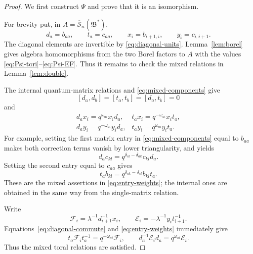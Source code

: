 \documentclass[11pt]{amsart}
\theoremstyle{remark}
\newcommand{\rSk}{\overline{\mathscr S}_n}
\newcommand{\Bstar}{\mathfrak B^{*}}
\begin{document}
\begin{proof}
We first construct $\Psi$ and prove that it is an isomorphism.

For brevity put, in $A=\rSk(\Bstar)$,
\[
 d_a=b_{aa},\qquad t_a=c_{aa},\qquad
 x_i=b_{i+1,i},\qquad y_i=c_{i,i+1}.
\]
The diagonal elements are invertible by
\eqref{eq:diagonal-units}.  Lemma~\ref{lem:borel} gives algebra
homomorphisms from the two Borel factors to $A$ with the values
\eqref{eq:Psi-tori}--\eqref{eq:Psi-EF}.  Thus it remains to check the
mixed relations in Lemma~\ref{lem:double}.

The internal quantum-matrix relations and
\eqref{eq:mixed-components} give
\begin{equation}\label{eq:diagonal-commute}
 [d_a,d_b]=[t_a,t_b]=[d_a,t_b]=0
\end{equation}
and
\begin{equation}\label{eq:entry-weights}
 \begin{array}{ll}
 d_ax_i=q^{\omega_{ai}}x_id_a,
   & t_ax_i=q^{-\omega_{ai}}x_it_a,\\[2pt]
 d_ay_i=q^{-\omega_{ai}}y_id_a,
   & t_ay_i=q^{\omega_{ai}}y_it_a.
 \end{array}
\end{equation}
For example, setting the first matrix entry in
\eqref{eq:mixed-components} equal to $b_{aa}$ makes both correction
terms vanish by lower triangularity, and yields
\[
 d_ac_{kl}=q^{\delta_{al}-\delta_{ak}}c_{kl}d_a.
\]
Setting the second entry equal to $c_{aa}$ gives
\[
 t_ab_{kl}=q^{\delta_{ak}-\delta_{al}}b_{kl}t_a.
\]
These are the mixed assertions in \eqref{eq:entry-weights}; the
internal ones are obtained in the same way from the single-matrix
relation.

Write
\[
 \mathcal F_i=\lambda^{-1}d_{i+1}^{-1}x_i,
 \qquad
 \mathcal E_i=-\lambda^{-1}y_it_{i+1}^{-1}.
\]
Equations~\eqref{eq:diagonal-commute} and
\eqref{eq:entry-weights} immediately give
\[
 t_a\mathcal F_it_a^{-1}=q^{-\omega_{ai}}\mathcal F_i,
 \qquad
 d_a^{-1}\mathcal E_id_a=q^{\omega_{ai}}\mathcal E_i.
\]
Thus the mixed toral relations are satisfied.


\end{proof}
\end{document}
